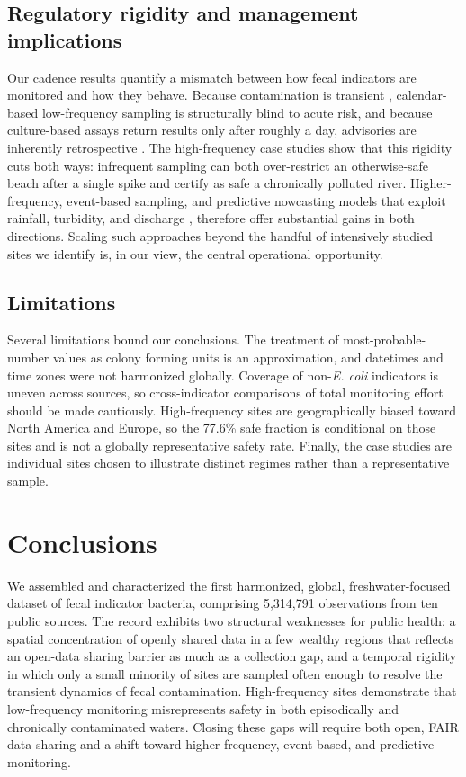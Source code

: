 \documentclass{agujournal2019}
\begin{document}
\subsection{Regulatory rigidity and management implications}
Our cadence results quantify a mismatch between how fecal indicators are monitored and how they behave. Because contamination is transient \cite{whitman2004escherichia,traister2006variability,meays2006diurnal}, calendar-based low-frequency sampling is structurally blind to acute risk, and because culture-based assays return results only after roughly a day, advisories are inherently retrospective \cite{kim2004public}. The high-frequency case studies show that this rigidity cuts both ways: infrequent sampling can both over-restrict an otherwise-safe beach after a single spike and certify as safe a chronically polluted river. Higher-frequency, event-based sampling, and predictive nowcasting models that exploit rainfall, turbidity, and discharge \cite{searcy2021day,searcy2023highfrequency,heasley2021systematic}, therefore offer substantial gains in both directions. Scaling such approaches beyond the handful of intensively studied sites we identify is, in our view, the central operational opportunity.

\subsection{Limitations}
Several limitations bound our conclusions. The treatment of most-probable-number values as colony forming units is an approximation, and datetimes and time zones were not harmonized globally. Coverage of non-\textit{E. coli} indicators is uneven across sources, so cross-indicator comparisons of total monitoring effort should be made cautiously. High-frequency sites are geographically biased toward North America and Europe, so the 77.6\% safe fraction is conditional on those sites and is not a globally representative safety rate. Finally, the case studies are individual sites chosen to illustrate distinct regimes rather than a representative sample.

\section{Conclusions}
We assembled and characterized the first harmonized, global, freshwater-focused dataset of fecal indicator bacteria, comprising 5{,}314{,}791 observations from ten public sources. The record exhibits two structural weaknesses for public health: a spatial concentration of openly shared data in a few wealthy regions that reflects an open-data sharing barrier as much as a collection gap, and a temporal rigidity in which only a small minority of sites are sampled often enough to resolve the transient dynamics of fecal contamination. High-frequency sites demonstrate that low-frequency monitoring misrepresents safety in both episodically and chronically contaminated waters. Closing these gaps will require both open, FAIR data sharing and a shift toward higher-frequency, event-based, and predictive monitoring.
\end{document}
